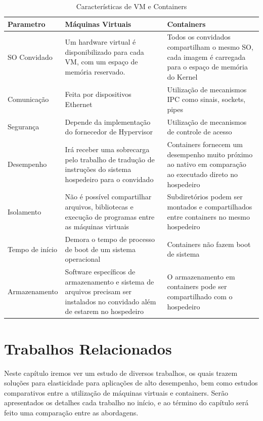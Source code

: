 \documentclass[twoside,english,brazilian]{UNISINOSmonografia}
\begin{document}
\begin{table}[!ht]
	\caption{Características de VM e Containers}
	\label{tab:table1}
	\centering%
	\begin{center}
		\begin{tabularx}{.8\textwidth}{|X|X|X|}
			\hline
			\textbf{Parametro} &\textbf{Máquinas Virtuais}\ &\textbf{Containers}\\
			\hline
			SO Convidado &Um hardware virtual é disponibilizado para cada VM, com um espaço de memória reservado. & Todos os convidados compartilham o mesmo SO, cada imagem é carregada para o espaço de memória do Kernel\\
			Comunicação & Feita por dispositivos Ethernet & Utilização de mecanismos IPC como sinais, sockets, pipes\\
			Segurança & Depende da implementação do fornecedor de Hypervisor & Utilização de mecanismos de controle de acesso\\
			Desempenho & Irá receber uma sobrecarga pelo trabalho de tradução de instruções do sistema hospedeiro para o convidado & Containers fornecem um desempenho muito próximo ao nativo em comparação ao executado direto no hospedeiro\\
			Isolamento & Não é possível compartilhar arquivos, bibliotecas e execução de programas entre as máquinas virtuais & Subdiretórios podem ser montados e compartilhados entre containers no mesmo hospedeiro\\
			Tempo de início & Demora o tempo de processo de boot de um sistema operacional & Containers não fazem boot de sistema\\
			Armazenamento & Software específicos de armazenamento e sistema de arquivos precisam ser instalados no convidado além de estarem no hospedeiro & O armazenamento em containers pode ser compartilhado com o hospedeiro\\
			\hline
		\end{tabularx}
	\end{center}
\end{table}

\chapter{Trabalhos Relacionados}
\label{related}
Neste capítulo iremos ver um estudo de diversos trabalhos, os quais trazem soluções para elasticidade para aplicações de alto desempenho, bem como estudos comparativos entre a utilização de máquinas virtuais e containers. Serão apresentados os detalhes cada trabalho no início, e ao término do capítulo será feito uma comparação entre as abordagens.
\end{document}
